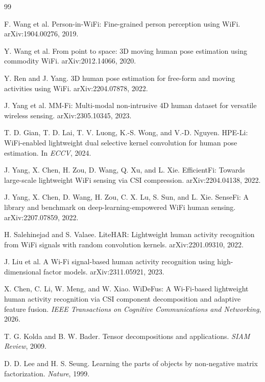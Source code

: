 \documentclass[letterpaper]{article}
\begin{document}

\begin{thebibliography}{99}

F. Wang et al.
\newblock Person-in-WiFi: Fine-grained person perception using WiFi.
\newblock arXiv:1904.00276, 2019.

Y. Wang et al.
\newblock From point to space: 3D moving human pose estimation using commodity WiFi.
\newblock arXiv:2012.14066, 2020.

Y. Ren and J. Yang.
\newblock 3D human pose estimation for free-form and moving activities using WiFi.
\newblock arXiv:2204.07878, 2022.

J. Yang et al.
\newblock MM-Fi: Multi-modal non-intrusive 4D human dataset for versatile wireless sensing.
\newblock arXiv:2305.10345, 2023.

T. D. Gian, T. D. Lai, T. V. Luong, K.-S. Wong, and V.-D. Nguyen.
\newblock HPE-Li: WiFi-enabled lightweight dual selective kernel convolution for human pose estimation.
\newblock In \emph{ECCV}, 2024.

J. Yang, X. Chen, H. Zou, D. Wang, Q. Xu, and L. Xie.
\newblock EfficientFi: Towards large-scale lightweight WiFi sensing via CSI compression.
\newblock arXiv:2204.04138, 2022.

J. Yang, X. Chen, D. Wang, H. Zou, C. X. Lu, S. Sun, and L. Xie.
\newblock SenseFi: A library and benchmark on deep-learning-empowered WiFi human sensing.
\newblock arXiv:2207.07859, 2022.

H. Salehinejad and S. Valaee.
\newblock LiteHAR: Lightweight human activity recognition from WiFi signals with random convolution kernels.
\newblock arXiv:2201.09310, 2022.

J. Liu et al.
\newblock A Wi-Fi signal-based human activity recognition using high-dimensional factor models.
\newblock arXiv:2311.05921, 2023.

X. Chen, C. Li, W. Meng, and W. Xiao.
\newblock WiDeFus: A Wi-Fi-based lightweight human activity recognition via CSI component decomposition and adaptive feature fusion.
\newblock \emph{IEEE Transactions on Cognitive Communications and Networking}, 2026.

T. G. Kolda and B. W. Bader.
\newblock Tensor decompositions and applications.
\newblock \emph{SIAM Review}, 2009.

D. D. Lee and H. S. Seung.
\newblock Learning the parts of objects by non-negative matrix factorization.
\newblock \emph{Nature}, 1999.

\end{thebibliography}
\end{document}
